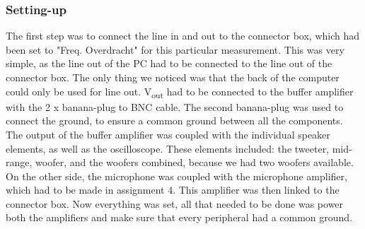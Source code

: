 \documentclass{article}
\begin{document}
\subsubsection{Setting-up}
The first step was to connect the line in and out to the connector box, which had been set to "Freq. Overdracht" for this particular measurement. This was very simple, as the line out of the PC had to be connected to the line out of the connector box. The only thing we noticed was that the back of the computer could only be used for line out. V\textsubscript{out} had to be connected to the buffer amplifier with the 2 x banana-plug to BNC cable. The second banana-plug was used to connect the ground, to ensure a common ground between all the components. The output of the buffer amplifier was coupled with the individual speaker elements, as well as the oscilloscope. These elements included: the tweeter, mid-range, woofer, and the woofers combined, because we had two woofers available. On the other side, the microphone was coupled with the microphone amplifier, which had to be made in assignment 4. This amplifier was then linked to the connector box. Now everything was set, all that needed to be done was power both the amplifiers and make sure that every peripheral had a common ground. 
\end{document}

